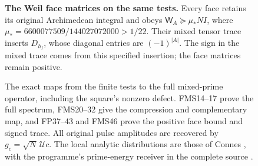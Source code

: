 \begin{figure}[p]
\begin{minipage}{0.92\linewidth}
\medskip
\textbf{The Weil face matrices on the same tests.}
Every face retains its original Archimedean integral and obeys
$\mathsf W_A\succeq\mu_*N I$, where
$\mu_*=6600077509/144027072000>1/22$.
Their mixed tensor trace inserts $D_{h_I}$, whose diagonal entries
are $(-1)^{|A|}$. The sign in the mixed trace comes from this
specified insertion; the face matrices remain positive.
\end{minipage}
\caption{The exact maps from the finite tests to the full mixed-prime
operator, including the square's nonzero defect. FMS14--17 prove
the full spectrum, FMS20--32 give the compression and complementary
map, and FP37--43 and FMS46 prove the positive face bound and
signed trace. All original pulse amplitudes are recovered by
$g_c=\sqrt N\,\mathcal Uc$. The local analytic distributions
are those of Connes \cite{Connes2026}, with the programme's
prime-energy receiver in the complete source \cite{Edition033}.}
\end{figure}
